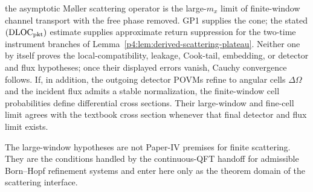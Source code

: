 \documentclass[12pt,a4paper]{article}
\begin{document}
\begin{theorem}
the asymptotic M\o ller scattering operator is the large-\(m_x\) limit of
finite-window channel transport with the free phase removed.  GP1 supplies
the cone; the stated \((\mathrm{DLOC}_{\rm pkt})\) estimate supplies approximate
return suppression for the two-time instrument branches of
Lemma~\ref{p4:lem:derived-scattering-plateau}.  Neither one by itself proves
the local-compatibility, leakage, Cook-tail, embedding, or detector and flux
hypotheses; once their displayed errors vanish, Cauchy convergence follows.
If, in addition, the outgoing detector POVMs refine to angular cells
\(\Delta\Omega\) and the incident flux admits a stable normalization, the
finite-window cell probabilities define differential cross sections.  Their
large-window and fine-cell limit agrees with the textbook cross section
whenever that final detector and flux limit exists.

The large-window hypotheses are not Paper-IV premises for finite scattering.
They are the conditions handled by the continuous-QFT handoff for admissible
Born--Hopf refinement systems and enter here only as the theorem domain of the
scattering interface.
\end{theorem}
\end{document}
